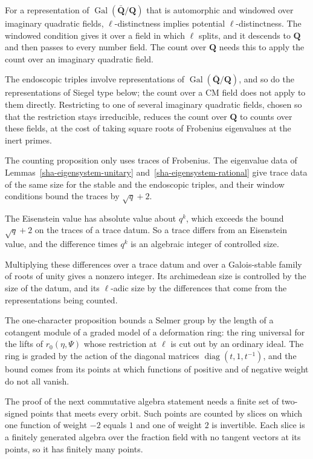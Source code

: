 For a representation of $\operatorname{Gal}(\bar{\mathbf Q}/\mathbf Q)$ that is automorphic and windowed over imaginary quadratic fields, $\ell$-distinctness implies potential $\ell$-distinctness. The windowed condition gives it over a field in which $\ell$ splits, and it descends to $\mathbf Q$ and then passes to every number field. The count over $\mathbf Q$ needs this to apply the count over an imaginary quadratic field.

The endoscopic triples involve representations of $\operatorname{Gal}(\bar{\mathbf Q}/\mathbf Q)$, and so do the representations of Siegel type below; the count over a CM field does not apply to them directly. Restricting to one of several imaginary quadratic fields, chosen so that the restriction stays irreducible, reduces the count over $\mathbf Q$ to counts over these fields, at the cost of taking square roots of Frobenius eigenvalues at the inert primes.

The counting proposition only uses traces of Frobenius. The eigenvalue data of Lemmas~\ref{sha-eigensystem-unitary} and~\ref{sha-eigensystem-rational} give trace data of the same size for the stable and the endoscopic triples, and their window conditions bound the traces by $\sqrt q+2$.

The Eisenstein value has absolute value about $q^k$, which exceeds the bound $\sqrt q+2$ on the traces of a trace datum. So a trace differs from an Eisenstein value, and the difference times $q^k$ is an algebraic integer of controlled size.

Multiplying these differences over a trace datum and over a Galois-stable family of roots of unity gives a nonzero integer. Its archimedean size is controlled by the size of the datum, and its $\ell$-adic size by the differences that come from the representations being counted.

The one-character proposition bounds a Selmer group by the length of a cotangent module of a graded model of a deformation ring: the ring universal for the lifts of $r_0(\eta,\Psi)$ whose restriction at $\ell$ is cut out by an ordinary ideal. The ring is graded by the action of the diagonal matrices $\operatorname{diag}(t,1,t^{-1})$, and the bound comes from its points at which functions of positive and of negative weight do not all vanish.

The proof of the next commutative algebra statement needs a finite set of two-signed points that meets every orbit. Such points are counted by slices on which one function of weight $-2$ equals $1$ and one of weight $2$ is invertible. Each slice is a finitely generated algebra over the fraction field with no tangent vectors at its points, so it has finitely many points.


